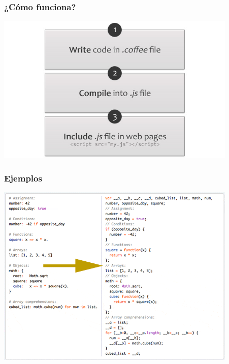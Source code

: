 \begin{frame}
\frametitle{¿Cómo funciona?}

\includegraphics[width=11.5cm]{figs/coffeescript_works.jpg} 

\end{frame}

\begin{frame}
\frametitle{Ejemplos}

\includegraphics[width=11.5cm]{figs/coffeescript_example.png} 


\end{frame}






